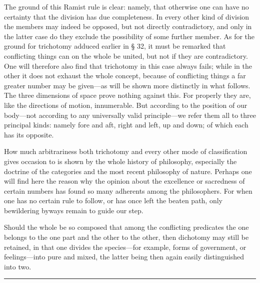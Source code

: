 \documentclass[12pt,a4paper]{article}
\begin{document}
The ground of this Ramist rule is clear: namely, that otherwise one can have no
certainty that the division has due completeness. In every other kind of
division the members may indeed be opposed, but not directly contradictory, and
only in the latter case do they exclude the possibility of some further member.
As for the ground for trichotomy adduced earlier in § 32, it must be remarked
that conflicting things can on the whole be united, but not if they are
contradictory. One will therefore also find that trichotomy in this case always
fails; while in the other it does not exhaust the whole concept, because of
conflicting things a far greater number may be given---as will be shown more
distinctly in what follows.
The three dimensions of space prove nothing against this. For properly they
are, like the directions of motion, innumerable. But according to the position
of our body---not according to any universally valid principle---we refer them
all to three principal kinds: namely fore and aft, right and left, up and down;
of which each has its opposite.

How much arbitrariness both trichotomy and every other mode of classification
gives occasion to is shown by the whole history of philosophy, especially the
doctrine of the categories and the most recent philosophy of nature. Perhaps one
will find here the reason why the opinion about the excellence or sacredness of
certain numbers has found so many adherents among the philosophers. For when one
has no certain rule to follow, or has once left the beaten path, only
bewildering byways remain to guide our step.

Should the whole be so composed that among the conflicting predicates the one
belongs to the one part and the other to the other, then dichotomy may still be
retained, in that one divides the species---for example, forms of government, or
feelings---into pure and mixed, the latter being then again easily distinguished
into two.


\begin{center}\rule{0.25\linewidth}{0.4pt}\end{center}
\end{document}
